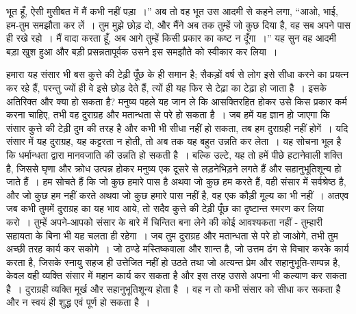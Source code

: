 भूत हूँ, ऐसी मुसीबत में मैं कभी नहीं पड़ा~।” अब तो वह भूत उस आदमी से कहने लगा, “आओ, भाई, हम-तुम समझौता कर लें~। तुम मुझे छोड़ दो, और मैंने अब तक तुम्हें जो कुछ दिया है, वह सब अपने पास ही रखे रहो~। मैं वादा करता हूँ, अब आगे तुम्हें किसी प्रकार का कष्ट न दूँगा~।” यह सुन वह आदमी बड़ा खुश हुआ और बड़ी प्रसन्नतापूर्वक उसने इस समझौते को स्वीकार कर लिया~।

हमारा यह संसार भी बस कुत्ते की टेढ़ी पूँछ के ही समान है; सैकड़ों वर्ष से लोग इसे सीधा करने का प्रयत्न कर रहे हैं, परन्तु ज्यों ही वे इसे छोड़ देते हैं, त्यों ही यह फिर से टेढ़ा का टेढ़ा हो जाता है~। इसके अतिरिक्त और क्या हो सकता है? मनुष्य पहले यह जान ले कि आसक्तिरहित होकर उसे किस प्रकार कर्म करना चाहिए, तभी वह दुराग्रह और मतान्धता से परे हो सकता है~। जब हमें यह ज्ञान हो जाएगा कि संसार कुत्ते की टेढ़ी दुम की तरह है और कभी भी सीधा नहीं हो सकता, तब हम दुराग्रही नहीं होगें~। यदि संसार में यह दुराग्रह, यह कट्टरता न होती, तो अब तक यह बहुत उन्नति कर लेता~। यह सोचना भूल है कि धर्मान्धता द्वारा मानवजाति की उन्नति हो सकती है~। बल्कि उल्टे, यह तो हमें पीछे हटानेवाली शक्ति है, जिससे घृणा और क्रोध उत्पन्न होकर मनुष्य एक दूसरे से लड़नेभिड़ने लगते हैं और सहानुभूतिशून्य हो जाते हैं~। हम सोचते हैं कि जो कुछ हमारे पास है अथवा जो कुछ हम करते हैं, वही संसार में सर्वश्रेष्ठ है, और जो कुछ हम नहीं करते अथवा जो कुछ हमारे पास नहीं है, वह एक कौड़ी मूल्य का भी नहीं~। अतएव जब कभी तुममें दुराग्रह का यह भाव आये, तो सदैव कुत्ते की टेढ़ी पूँछ का दृष्टान्त स्मरण कर लिया करो~। तुम्हें अपने-आपको संसार के बारे में चिन्तित बना लेने की कोई आवश्यकता नहीं - तुम्हारी सहायता के बिना भी यह चलता ही रहेगा~। जब तुम दुराग्रह और मतान्धता से परे हो जाओगे, तभी तुम अच्छी तरह कार्य कर सकोगे~। जो ठण्डे मस्तिष्कवाला और शान्त है, जो उत्तम ढंग से विचार करके कार्य करता है, जिसके स्नायु सहज ही उत्तेजित नहीं हो उठते तथा जो अत्यन्त प्रेम और सहानुभूति-सम्पन्न है, केवल वही व्यक्ति संसार में महान कार्य कर सकता है और इस तरह उससे अपना भी कल्याण कर सकता है~। दुराग्रही व्यक्ति मूर्ख और सहानुभूतिशून्य होता है~। वह न तो कभी संसार को सीधा कर सकता है और न स्वयं ही शुद्ध एवं पूर्ण हो सकता है~।

